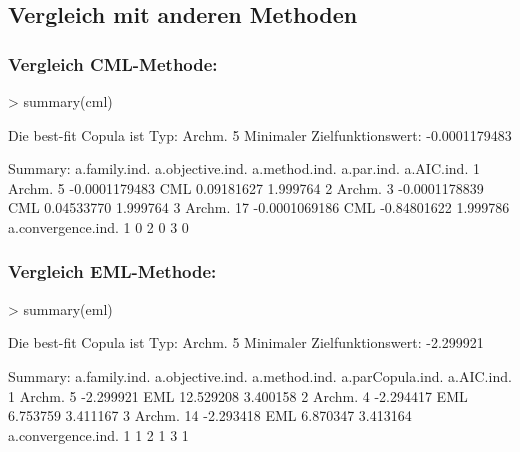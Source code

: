 \subsection{Vergleich mit anderen Methoden}
\begin{frame}[containsverbatim]
  \frametitle{Vergleich CML-Methode:}
\scriptsize{
\begin{Schunk}
\begin{Sinput}
> summary(cml)
\end{Sinput}
\begin{Soutput}
 Die best-fit Copula ist Typ:  Archm. 5 
 Minimaler Zielfunktionswert:  -0.0001179483 

Summary:
  a.family.ind. a.objective.ind. a.method.ind.  a.par.ind. a.AIC.ind.
1      Archm. 5    -0.0001179483           CML  0.09181627   1.999764
2      Archm. 3    -0.0001178839           CML  0.04533770   1.999764
3     Archm. 17    -0.0001069186           CML -0.84801622   1.999786
  a.convergence.ind.
1                  0
2                  0
3                  0
\end{Soutput}
\end{Schunk}
}
\end{frame}

\begin{frame}[containsverbatim]
  \frametitle{Vergleich EML-Methode:}
\scriptsize{
\begin{Schunk}
\begin{Sinput}
> summary(eml)
\end{Sinput}
\begin{Soutput}
 Die best-fit Copula ist Typ:  Archm. 5 
 Minimaler Zielfunktionswert:  -2.299921 

Summary:
  a.family.ind. a.objective.ind. a.method.ind. a.parCopula.ind. a.AIC.ind.
1      Archm. 5        -2.299921           EML        12.529208   3.400158
2      Archm. 4        -2.294417           EML         6.753759   3.411167
3     Archm. 14        -2.293418           EML         6.870347   3.413164
  a.convergence.ind.
1                  1
2                  1
3                  1
\end{Soutput}
\end{Schunk}
}
\end{frame}
